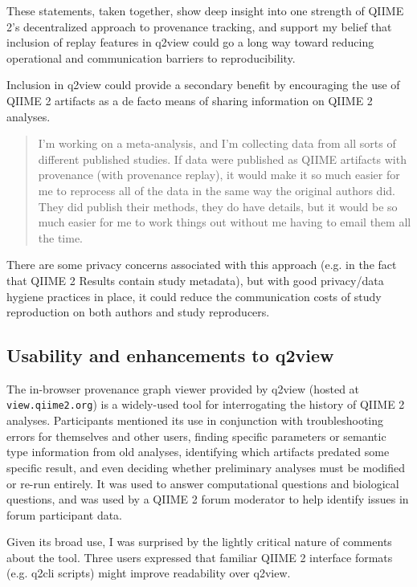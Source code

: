 \noindent These statements, taken together, show deep insight into one strength of QIIME
2’s decentralized approach to provenance tracking, and support my belief that
inclusion of replay features in q2view could go a long way toward reducing
operational and communication barriers to reproducibility. 

Inclusion in q2view could provide a secondary benefit by encouraging the use of
QIIME 2 artifacts as a de facto means of sharing information on QIIME 2 analyses.

\begin{quote}
I'm working on a meta-analysis, and I'm collecting data from all sorts of
different published studies. If data were published as QIIME artifacts with
provenance (with provenance replay), it would make it so much easier for me to
reprocess all of the data in the same way the original authors did. They did
publish their methods, they do have details, but it would be so much easier for
me to work things out without me having to email them all the time.
\end{quote}

\noindent There are some privacy concerns associated with this approach (e.g. in the fact
that QIIME 2 Results contain study metadata), but with good privacy/data hygiene
practices in place, it could reduce the communication costs of study
reproduction on both authors and study reproducers.

\subsection{Usability and enhancements to q2view}
\label{section:q2view_enh}

The in-browser provenance graph viewer provided by q2view (hosted at
\texttt{view.qiime2.org}) is a widely-used tool for interrogating the history of QIIME 2
analyses. Participants mentioned its use in conjunction with troubleshooting
errors for themselves and other users, finding specific parameters or semantic
type information from old analyses, identifying which artifacts predated some
specific result, and even deciding whether preliminary analyses must be modified
or re-run entirely. It was used to answer computational questions and biological
questions, and was used by a QIIME 2 forum moderator to help identify issues in
forum participant data.

Given its broad use, I was surprised by the lightly critical nature of comments
about the tool. Three users expressed that familiar QIIME 2 interface formats
(e.g. q2cli scripts) might improve readability over q2view. 

